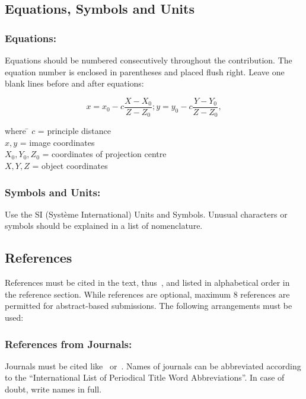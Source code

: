 \documentclass{isprs} %
\begin{document}
\subsection{Equations, Symbols and Units}\label{sec:Equations, Symbols and Units}

\subsubsection{Equations:}\label{sec:Equations}

Equations should be numbered consecutively throughout the contribution. The equation
number is enclosed in parentheses and placed flush right. Leave one blank lines
before and after equations:


\begin{equation}\label{equ:1}
	x = x_0 -c \frac{X - X_0}{Z - Z_0}; y = y_0 -c \frac{Y - Y_0}{Z - Z_0},
\end{equation}

\begin{tabbing}
where \hspace{0.6cm} \= $c$ = principle distance\\
\> $x,y$ = image coordinates\\
\> $X_0,Y_0, Z_0$ = coordinates of projection centre\\
\> $X, Y, Z$ = object coordinates
\end{tabbing}

\subsubsection{Symbols and Units:}\label{sec:Symbols and Units}
Use the SI (Syst\`{e}me International) Units and Symbols. Unusual characters
or symbols should be explained in a list of nomenclature.

\subsection{References}\label{sec:References}
References must be cited in the text, thus~\cite{smith1987rep}, and listed in alphabetical order in the reference section. While references are optional, maximum 8 references are permitted for abstract-based submissions. The following arrangements must be used:

\subsubsection{References from Journals:}
Journals must be cited like~\cite{smith1987} or~\cite{michalis2008}. Names of journals can be abbreviated according to the ``International List of Periodical Title Word Abbreviations''. In case of doubt, write names in full.
\end{document}
